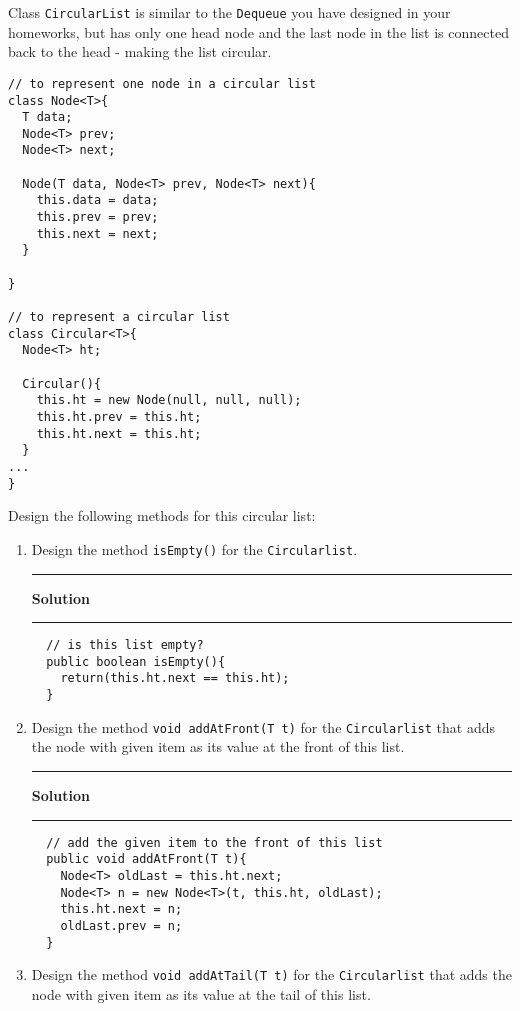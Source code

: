 \documentclass[11pt]{article}
\def\thel{\noindent\rule{2.5cm}{.5pt}}
\def\begsol#1{\thel {\bf Solution} \thel}\def\endsol{\relax}
\def\pts#1{\marginpar{\footnotesize \raggedright  \fbox{#1 {\sc Points}}}}
\newcounter{Pctr}
\newenvironment{problem}{\stepcounter{Pctr}%
\begin{description}
\item[\noindent{\bf Problem} \arabic{Pctr}]
\end{description}}{\relax}
\begin{document}
\newpage
\pts{15}
\begin{problem}
Class \texttt{CircularList} is similar to the \texttt{Dequeue} you
have designed in your homeworks, but has only one head node and the
last node in the list is connected back to the head - making the list
circular. 

\begin{verbatim}
// to represent one node in a circular list
class Node<T>{
  T data;
  Node<T> prev;
  Node<T> next;
  
  Node(T data, Node<T> prev, Node<T> next){
    this.data = data;
    this.prev = prev;
    this.next = next;
  } 
  
}

// to represent a circular list
class Circular<T>{
  Node<T> ht;
  
  Circular(){
    this.ht = new Node(null, null, null);
    this.ht.prev = this.ht;
    this.ht.next = this.ht;
  }
...
}
\end{verbatim}


Design the following methods for this circular list:

\begin{enumerate}
\newpage
\item Design the method \texttt{isEmpty()} for the
  \texttt{Circularlist}.


\begsol{\vspace{0.5in}}
\begin{verbatim}
  // is this list empty?
  public boolean isEmpty(){
    return(this.ht.next == this.ht);
  }

\end{verbatim}
\endsol

\newpage
\item Design the method \texttt{void addAtFront(T t)} for the
  \texttt{Circularlist} that adds the node with given item as its
  value at the front of this list.


\begsol{\vspace{0.5in}}
\begin{verbatim}
  // add the given item to the front of this list
  public void addAtFront(T t){
    Node<T> oldLast = this.ht.next;
    Node<T> n = new Node<T>(t, this.ht, oldLast);
    this.ht.next = n;
    oldLast.prev = n;
  }
\end{verbatim}
\endsol

\newpage
\item Design the method \texttt{void addAtTail(T t)} for the
  \texttt{Circularlist} that adds the node with given item as its
  value at the tail of this list.



\end{enumerate}
\end{problem}
\end{document}

